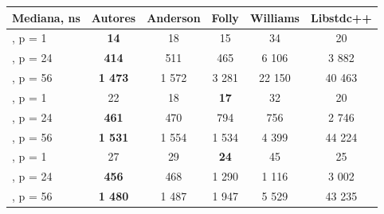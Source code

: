 \begin{tabularx}{\linewidth}{@{}p{30mm}CCCCC@{}}
\toprule
\textbf{Mediana, ns} & \textbf{Autores} & \textbf{Anderson} & \textbf{Folly} & \textbf{Williams} & \textbf{Libstdc++}\\
\midrule
{}, p = 1 & \textbf{14} & 18 & 15 & 34 & 20\\
, p = 24 & \textbf{414} & 511 & 465 & 6 106 & 3 882\\
, p = 56 & \textbf{1 473} & 1 572 & 3 281 & 22 150 & 40 463\\
, p = 1 & 22 & 18 & \textbf{17} & 32 & 20\\
, p = 24 & \textbf{461} & 470 & 794 & 756 & 2 746\\
, p = 56 & \textbf{1 531} & 1 554 & 1 534 & 4 399 & 44 224\\
, p = 1 & 27 & 29 & \textbf{24} & 45 & 25\\
, p = 24 & \textbf{456} & 468 & 1 290 & 1 116 & 3 002\\
, p = 56 & \textbf{1 480} & 1 487 & 1 947 & 5 529 & 43 235\\
\bottomrule
\end{tabularx}
